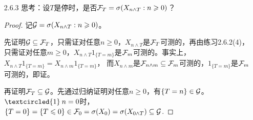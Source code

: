 \begin{enumerate}
\begin{proof}
        为证明$\{T\leqslant n\}\in\F_n,\forall n\geqslant0\Leftrightarrow\{T=n\}\in\F_n,\forall n\geqslant0$，
        在上述过程中令$B=\Omega$即可。

        (2)由于$T$取值于$\Z_+\cup\{+\infty\}$，故仅需证$\forall k\geqslant0$，$\{T\leqslant k\}\in\F_T$，
        即$\forall n\geqslant0$，$\{T\leqslant k\}\cap\{T\leqslant n\}\in\F_n$。根据自然流的性质与$T$是停时可知
        $\{T\leqslant k\}\cap\{T\leqslant n\}=\{T\leqslant(k\land n)\}\in\F_{k\land n}\subseteq \F_n$，即证。

        (3)记$y$的进入时与首中时分别为$\tau_y,T_y$。对任意$n\geqslant0$，
        \[\{\tau_y\leqslant n\}=\bigcup_{k=0}^n\{X_k=y\}\in\F_n,\quad\{T_y\leqslant n\}=\bigcup_{k=1}^n\{X_k=y\}\in\F_n,\]
        故$\tau_y,T_y$都是停时。

        (4)由(1)可知$\F_T=\{B\in\F:B\cap\{T=n\}\in F_n,\forall n\geqslant0\}$。

        充分性：对任意Borel集$A\subseteq\R$与$n\geqslant0$，由$Y1_{\{T=n\}}$是$\F_n$可测的知
        $\{Y\in A\}\cap\{T=n\}=\{Y1_{\{T=n\}}\in A\}\cap\{T=n\}\in\F_n$，故$\{Y\in A\}\in\F_T$，
        从而$Y$是$\F_T$可测的。

        必要性：对任意Borel集$A\subseteq\R$与$n\geqslant0$，由$T$是停时知$\{T\neq n,0\in A\}\in\F_n$，
        从而由$Y$是$\F_T$可测的知\[\{Y1_{\{T=n\}}\in A\}=(\{Y\in A\}\cap\{T=n\})\cup\{T\neq n,0\in A\}\in\F_n,\]
        故$Y1_{\{T=n\}}$是$\F_n$可测的。
    \end{proof}
    \item[2.6.3] 思考：设$T$是停时，是否$\mathcal{F}_T=\sigma(X_{n\land T}:n\geqslant0)$？
    \begin{proof}
        记$\mathcal{G}=\sigma(X_{n\land T}:n\geqslant0)$。

        先证明$\mathcal{G}\subseteq\mathcal{F}_T$，只需证对任意$n\geqslant0$，$X_{n\land T}$是$\F_T$可测的，再由练习2.6.2(4)，
        只需证对任意$m\geqslant0$，$X_{n\land T}1_{\{T=m\}}$是$\mathcal{F}_m$可测的。事实上，
        $X_{n\land T}1_{\{T=m\}}=X_{n\land m}1_{\{T=m\}}$，
        而$X_{n\land m}$是$\mathcal{F}_{n\land m}\subseteq\mathcal{F}_m$可测的，$1_{\{T=m\}}$是$\mathcal{F}_m$可测的，即证。

        再证明$\mathcal{F}_T\subseteq\mathcal{G}$。先通过归纳证明对任意$n\geqslant0$，有$\{T=n\}\in\mathcal{G}$。
        $\textcircled{1}\:n=0$时，$\{T=0\}=\{T\leqslant0\}\in\mathcal{F}_0=\sigma(X_0)=\sigma(X_{0\land T})\subseteq\mathcal{G}$.


\end{proof}
\end{enumerate}
